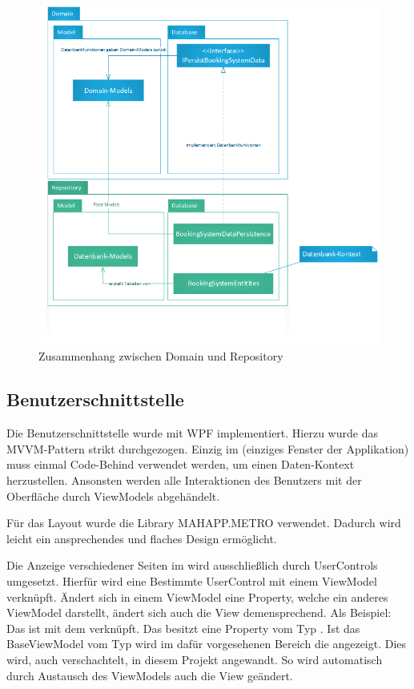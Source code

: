 \begin{figure}[h]
	\begin{center}
		\includegraphics[width=\columnwidth]{Implementierung/Model-Datenbank.png}
	\end{center}
	\caption{Zusammenhang zwischen Domain und Repository}
	\label{fig:model-database}
\end{figure}

\subsection{Benutzerschnittstelle}
Die Benutzerschnittstelle wurde mit WPF implementiert. Hierzu wurde das MVVM-Pattern strikt durchgezogen. Einzig im  (einziges Fenster der Applikation) muss einmal Code-Behind verwendet werden, um einen Daten-Kontext herzustellen. Ansonsten werden alle Interaktionen des Benutzers mit der Oberfläche durch ViewModels abgehändelt. 

Für das Layout wurde die Library MAHAPP.METRO verwendet. Dadurch wird leicht ein ansprechendes und flaches Design ermöglicht.

Die Anzeige verschiedener Seiten im  wird ausschließlich durch UserControls umgesetzt. Hierfür wird eine Bestimmte UserControl mit einem ViewModel verknüpft. Ändert sich in einem ViewModel eine Property, welche ein anderes ViewModel darstellt, ändert sich auch die View demensprechend. 
Als Beispiel: Das  ist mit dem  verknüpft. Das  besitzt eine Property  vom Typ . Ist das BaseViewModel vom Typ  wird im dafür vorgesehenen Bereich die  angezeigt. Dies wird, auch verschachtelt, in diesem Projekt angewandt. So wird automatisch durch Austausch des ViewModels auch die View geändert. 